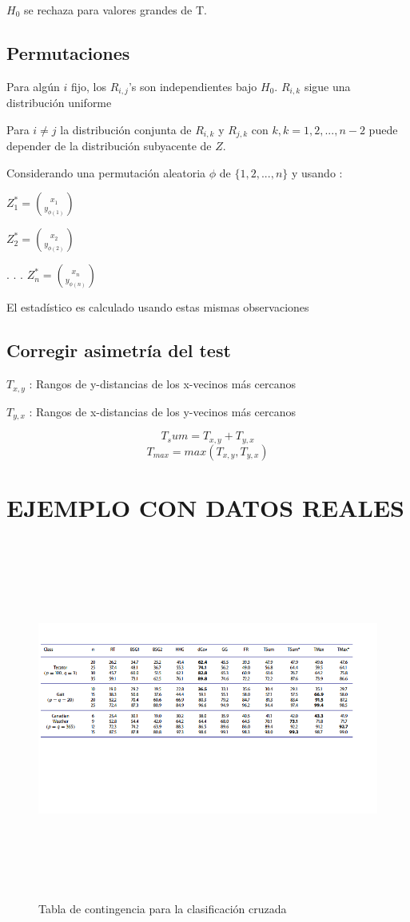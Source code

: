 \documentclass[]{book}
\begin{document}
\(H_0\) se rechaza para valores grandes de T.

\section{Permutaciones}\label{permutaciones}

Para algún \(i\) fijo, los \(R_{i,j}\)'s son independientes bajo
\(H_0\). \(R_{i,k}\) sigue una distribución uniforme

Para \(i\neq j\) la distribución conjunta de \(R_{i,k}\) y \(R_{j,k}\)
con \(k, k=1,2, ... , n-2\) puede depender de la distribución subyacente
de \(Z\).

Considerando una permutación aleatoria \(\phi\) de
\(\{ 1, 2, ... , n \}\) y usando :

\(Z_1 ^ * = \binom {x_1}{ y_{\phi (1)}}\)

\(Z_2 ^* = \binom {x_2}{ y_{\phi (2)}}\)

. . . \(Z_n ^* = \binom {x_n}{ y_{\phi (n)}}\)

El estadístico es calculado usando estas mismas observaciones

\section{Corregir asimetría del test}\label{corregir-asimetria-del-test}

\(T_{x,y}\) : Rangos de y-distancias de los x-vecinos más cercanos

\(T_{y,x}\) : Rangos de x-distancias de los y-vecinos más cercanos

\[T_sum = T_{x,y} + T_{y,x}\] \[T_{max} = max (T_{x,y}, T_{y,x})\]

\chapter{EJEMPLO CON DATOS REALES}\label{ejemplo-con-datos-reales}

\begin{figure}
  
  {\centering \includegraphics[width=800,height=450]{invento} 
  
  }
  
  \caption{Tabla de contingencia para la clasificación cruzada}\label{fig:unnamed-chunk-9}
  \end{figure}
\end{document}
